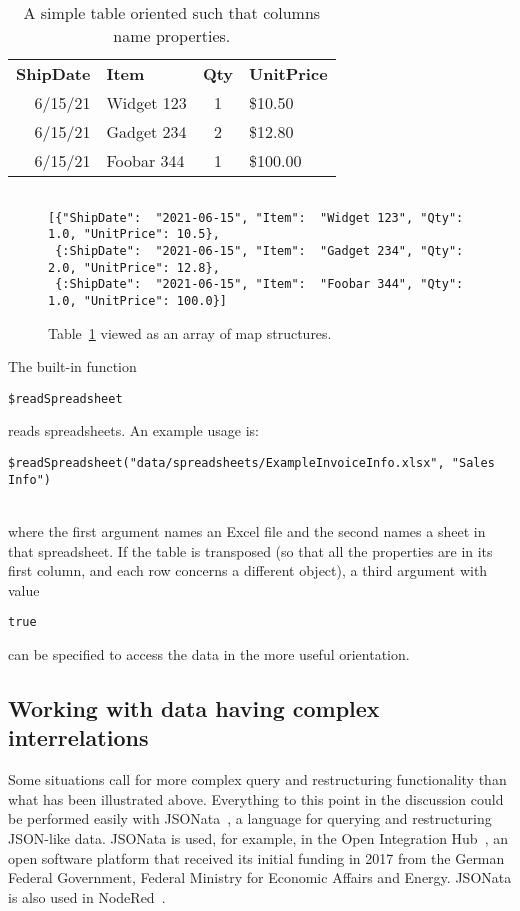 \documentclass[9pt,letterpaper]{article}
\newcommand{\stt}[1]{\begin{footnotesize}\texttt{#1}\end{footnotesize}}
\begin{document}
\begin{table}[H]
  \caption{A simple table oriented such that columns name properties.}
\label{table:simple}      
\begin{tabular}{r | l | c | l}

\textbf{ShipDate}& \textbf{Item}& \textbf{Qty}& \textbf{UnitPrice} \\ \hhline{=|=|=|=} 
        6/15/21	      & Widget 123   &	1	   &  \$10.50 \\
        6/15/21	      & Gadget 234   &	2	   &  \$12.80 \\
        6/15/21	      & Foobar 344   &	1	   &  \$100.00
\end{tabular}
\end{table}

\begin{figure}[H]
    \caption{Table~\ref{table:simple} viewed as an array of map structures.}
    \label{code:simple}
\begin{lstlisting}

[{"ShipDate":  "2021-06-15", "Item":  "Widget 123", "Qty": 1.0, "UnitPrice": 10.5},
 {:ShipDate":  "2021-06-15", "Item":  "Gadget 234", "Qty": 2.0, "UnitPrice": 12.8},
 {:ShipDate":  "2021-06-15", "Item":  "Foobar 344", "Qty": 1.0, "UnitPrice": 100.0}]
\end{lstlisting}
\end{figure}

The built-in function \stt{\$readSpreadsheet} reads spreadsheets. 
An example usage is:\\
\vspace{3mm}
\stt{\$readSpreadsheet("data/spreadsheets/ExampleInvoiceInfo.xlsx", "Sales Info")} \\
\vspace{3mm}
where the first argument names an Excel file and the second names a sheet in that spreadsheet.
If the table is transposed (so that all the properties are in its first column, and each row concerns a different object), a third argument with value \stt{true} can be specified to access the data in the more useful orientation.

\subsection{Working with data having complex interrelations}

Some situations call for more complex query and restructuring functionality than what has been illustrated above. 
Everything to this point in the discussion could be performed easily with JSONata~\cite{Jsonata.org2021}, a language for querying and restructuring JSON-like data.
JSONata is used, for example, in the Open Integration Hub~\cite{OIH2021}, an open software platform that received its initial funding in 2017 from the German Federal Government,
Federal Ministry for Economic Affairs and Energy. %
JSONata is also used in NodeRed~\cite{Node-Red2021}. 
\end{document}
